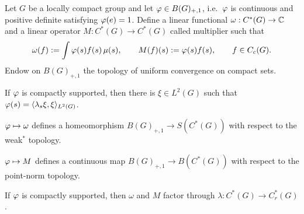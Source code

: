 \documentclass{../../../small}
\begin{document}
\begin{prop}
Let $G$ be a locally compact group and let $\varphi\in B(G)_{+,1}$, i.e.~$\varphi$ is continuous and positive definite satisfying $\varphi(e)=1$.
Define a linear functional $\omega:C^*(G)\to\mathbb{C}$ and a linear operator $M:C^*(G)\to C^*(G)$ called multiplier such that
\[\omega(f):=\int\varphi(s)f(s)\,\mu(s),\qquad M(f)(s):=\varphi(s)f(s),\qquad f\in C_c(G).\]
Endow on $B(G)_{+,1}$ the topology of uniform convergence on compact sets.
\begin{parts}
\item If $\varphi$ is compactly supported, then there is $\xi\in L^2(G)$ such that $\varphi(s)=\langle\lambda_s\xi,\xi\rangle_{L^2(G)}$.
\item $\varphi\mapsto\omega$ defines a homeomorphism $B(G)_{+,1}\to S(C^*(G))$ with respect to the weak$^*$ topology.
\item $\varphi\mapsto M$ defines a continuous map $B(G)_{+,1}\to B(C^*(G))$ with respect to the point-norm topology.
\item If $\varphi$ is compactly supported, then $\omega$ and $M$ factor through $\lambda:C^*(G)\to C_r^*(G)$.
\end{parts}
\end{prop}
\end{document}
